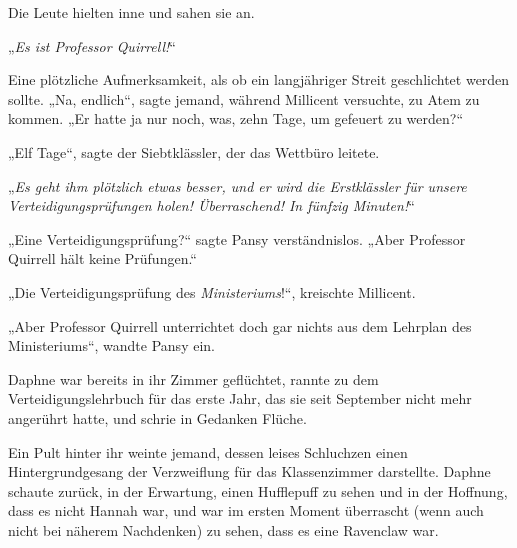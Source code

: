 Die Leute hielten inne und sahen sie an.

„\emph{Es ist Professor Quirrell!}“

Eine plötzliche Aufmerksamkeit, als ob ein langjähriger Streit geschlichtet werden sollte.
„Na, endlich“, sagte jemand, während Millicent versuchte, zu Atem zu kommen. „Er hatte ja nur noch, was, zehn Tage, um gefeuert zu werden?“

„Elf Tage“, sagte der Siebtklässler, der das Wettbüro leitete.

„\emph{Es geht ihm plötzlich etwas besser, und er wird die Erstklässler für unsere Verteidigungsprüfungen holen! Überraschend! In fünfzig Minuten!}“

„Eine Verteidigungsprüfung?“ sagte Pansy verständnislos. „Aber Professor Quirrell hält keine Prüfungen.“

„Die Verteidigungsprüfung des \emph{Ministeriums}!“, kreischte Millicent.

„Aber Professor Quirrell unterrichtet doch gar nichts aus dem Lehrplan des Ministeriums“, wandte Pansy ein.

Daphne war bereits in ihr Zimmer geflüchtet, rannte zu dem Verteidigungslehrbuch für das erste Jahr, das sie seit September nicht mehr angerührt hatte, und schrie in Gedanken Flüche.

\later

Ein Pult hinter ihr weinte jemand, dessen leises Schluchzen einen Hintergrundgesang der Verzweiflung für das Klassenzimmer darstellte. Daphne schaute zurück, in der Erwartung, einen Hufflepuff zu sehen und in der Hoffnung, dass es nicht Hannah war, und war im ersten Moment überrascht (wenn auch nicht bei näherem Nachdenken) zu sehen, dass es eine Ravenclaw war.

